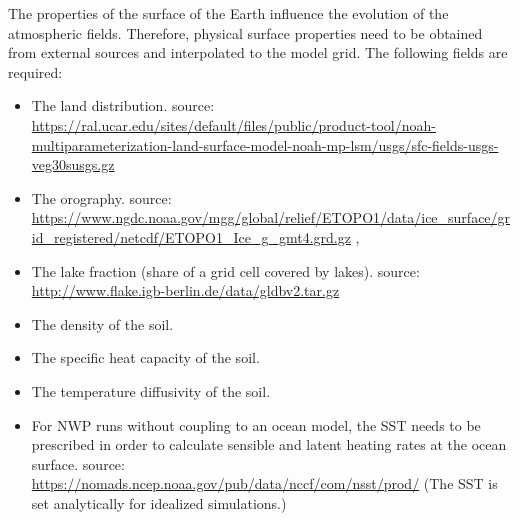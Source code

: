 \documentclass[10pt]{report}
\begin{document}
The properties of the surface of the Earth influence the evolution of the atmospheric fields. Therefore, physical surface properties need to be obtained from external sources and interpolated to the model grid. The following fields are required:
%
\begin{itemize}
\item The land distribution. source: \url{https://ral.ucar.edu/sites/default/files/public/product-tool/noah-multiparameterization-land-surface-model-noah-mp-lsm/usgs/sfc-fields-usgs-veg30susgs.gz} \cite{glcc}
\item The orography. source: \url{https://www.ngdc.noaa.gov/mgg/global/relief/ETOPO1/data/ice_surface/grid_registered/netcdf/ETOPO1_Ice_g_gmt4.grd.gz} \cite{etopo1}, \cite{etopo1_add}
\item The lake fraction (share of a grid cell covered by lakes). source: \url{http://www.flake.igb-berlin.de/data/gldbv2.tar.gz} \cite{gldb}
\item The density of the soil.
\item The specific heat capacity of the soil.
\item The temperature diffusivity of the soil.
\item For NWP runs without coupling to an ocean model, the SST needs to be prescribed in order to calculate sensible and latent heating rates at the ocean surface. source: \url{https://nomads.ncep.noaa.gov/pub/data/nccf/com/nsst/prod/} (The SST is set analytically for idealized simulations.)
\end{itemize}

\appendix

\printbibliography
\end{document}
